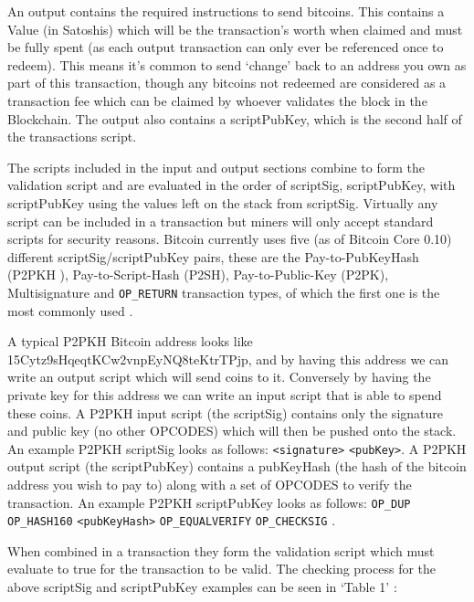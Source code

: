 \documentclass{article}
\begin{document}
An output contains the required instructions to send bitcoins. This contains a Value (in Satoshis) which will be the transaction’s worth when claimed and must be fully spent (as each output transaction can only ever be referenced once to redeem). This means it's common to send `change' back to an address you own as part of this transaction, though any bitcoins not redeemed are considered as a transaction fee which can be claimed by whoever validates the block in the Blockchain. The output also contains a scriptPubKey, which is the second half of the transactions script.

The scripts included in the input and output sections combine to form the validation script and are evaluated in the order of scriptSig, scriptPubKey, with scriptPubKey using the values left on the stack from scriptSig. Virtually any script can be included in a transaction but miners will only accept standard scripts for security reasons. Bitcoin currently uses five (as of Bitcoin Core 0.10) different scriptSig/scriptPubKey pairs, these are the Pay-to-PubKeyHash (P2PKH ), Pay-to-Script-Hash (P2SH), Pay-to-Public-Key (P2PK), Multisignature and \verb|OP_RETURN| transaction types, of which the first one is the most commonly used \citep{32_de_rosa_2015}\citep{33_kofler_2014}.

A typical P2PKH Bitcoin address looks like 15Cytz9sHqeqtKCw2vnpEyNQ8teKtrTPjp, and by having this address we can write an output script which will send coins to it. Conversely by having the private key for this address we can write an input script that is able to spend these coins. A P2PKH input script (the scriptSig) contains only the signature and public key (no other OPCODES) which will then be pushed onto the stack. An example P2PKH scriptSig looks as follows: \verb|<signature>| \verb|<pubKey>|. A P2PKH output script (the scriptPubKey) contains a pubKeyHash (the hash of the bitcoin address you wish to pay to) along with a set of OPCODES to verify the transaction. An example P2PKH scriptPubKey looks as follows: \verb|OP_DUP| \verb|OP_HASH160| \verb|<pubKeyHash>| \verb|OP_EQUALVERIFY| \verb|OP_CHECKSIG| \citep{33_kofler_2014}\citep{30_transactions_-_bitcoin_wiki_2016}.

When combined in a transaction they form the validation script which must evaluate to true for the transaction to be valid. The checking process for the above scriptSig and scriptPubKey examples can be seen in `Table 1' \citep{32_de_rosa_2015}\citep{30_transactions_-_bitcoin_wiki_2016}:


    
\end{document}

